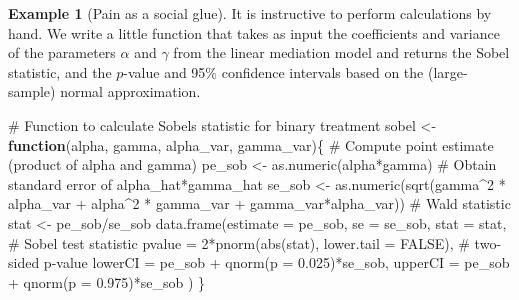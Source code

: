 \documentclass[
  11pt,
  letterpaper,
]{scrbook}
\newenvironment{Shaded}{\begin{snugshade}}{\end{snugshade}}
\newcommand{\AttributeTok}[1]{\textcolor[rgb]{0.40,0.45,0.13}{#1}}
\newcommand{\CommentTok}[1]{\textcolor[rgb]{0.37,0.37,0.37}{#1}}
\newcommand{\ConstantTok}[1]{\textcolor[rgb]{0.56,0.35,0.01}{#1}}
\newcommand{\ControlFlowTok}[1]{\textcolor[rgb]{0.00,0.23,0.31}{\textbf{#1}}}
\newcommand{\DecValTok}[1]{\textcolor[rgb]{0.68,0.00,0.00}{#1}}
\newcommand{\FloatTok}[1]{\textcolor[rgb]{0.68,0.00,0.00}{#1}}
\newcommand{\FunctionTok}[1]{\textcolor[rgb]{0.28,0.35,0.67}{#1}}
\newcommand{\NormalTok}[1]{\textcolor[rgb]{0.00,0.23,0.31}{#1}}
\newcommand{\OtherTok}[1]{\textcolor[rgb]{0.00,0.23,0.31}{#1}}
\newcommand{\SpecialCharTok}[1]{\textcolor[rgb]{0.37,0.37,0.37}{#1}}
\theoremstyle{definition}
\newtheorem{example}{Example}[chapter]
\theoremstyle{definition}
\theoremstyle{remark}
\begin{document}
\begin{example}[Pain as a social
glue]
It is instructive to perform calculations by hand. We write a little
function that takes as input the coefficients and variance of the
parameters \(\alpha\) and \(\gamma\) from the linear mediation model and
returns the Sobel statistic, and the \(p\)-value and 95\% confidence
intervals based on the (large-sample) normal approximation.

\begin{Shaded}
\begin{Highlighting}[]
\CommentTok{\# Function to calculate Sobel\textquotesingle{}s statistic for binary treatment}
\NormalTok{sobel }\OtherTok{\textless{}{-}} \ControlFlowTok{function}\NormalTok{(alpha, gamma, alpha\_var, gamma\_var)\{}
  \CommentTok{\# Compute point estimate (product of alpha and gamma)}
\NormalTok{  pe\_sob }\OtherTok{\textless{}{-}} \FunctionTok{as.numeric}\NormalTok{(alpha}\SpecialCharTok{*}\NormalTok{gamma)}
  \CommentTok{\# Obtain standard error of alpha\_hat*gamma\_hat}
\NormalTok{  se\_sob }\OtherTok{\textless{}{-}} \FunctionTok{as.numeric}\NormalTok{(}\FunctionTok{sqrt}\NormalTok{(gamma}\SpecialCharTok{\^{}}\DecValTok{2} \SpecialCharTok{*}\NormalTok{ alpha\_var }\SpecialCharTok{+}\NormalTok{ alpha}\SpecialCharTok{\^{}}\DecValTok{2} \SpecialCharTok{*}\NormalTok{ gamma\_var  }\SpecialCharTok{+}\NormalTok{ gamma\_var}\SpecialCharTok{*}\NormalTok{alpha\_var))}
  \CommentTok{\# Wald statistic}
\NormalTok{  stat }\OtherTok{\textless{}{-}}\NormalTok{ pe\_sob}\SpecialCharTok{/}\NormalTok{se\_sob}
  \FunctionTok{data.frame}\NormalTok{(}\AttributeTok{estimate =}\NormalTok{ pe\_sob,}
             \AttributeTok{se =}\NormalTok{ se\_sob,}
             \AttributeTok{stat =}\NormalTok{ stat, }\CommentTok{\# Sobel test statistic}
             \AttributeTok{pvalue =} \DecValTok{2}\SpecialCharTok{*}\FunctionTok{pnorm}\NormalTok{(}\FunctionTok{abs}\NormalTok{(stat), }\AttributeTok{lower.tail =} \ConstantTok{FALSE}\NormalTok{), }\CommentTok{\# two{-}sided p{-}value}
             \AttributeTok{lowerCI =}\NormalTok{ pe\_sob }\SpecialCharTok{+} \FunctionTok{qnorm}\NormalTok{(}\AttributeTok{p =} \FloatTok{0.025}\NormalTok{)}\SpecialCharTok{*}\NormalTok{se\_sob,}
             \AttributeTok{upperCI =}\NormalTok{ pe\_sob }\SpecialCharTok{+} \FunctionTok{qnorm}\NormalTok{(}\AttributeTok{p =} \FloatTok{0.975}\NormalTok{)}\SpecialCharTok{*}\NormalTok{se\_sob}
\NormalTok{  )}
\NormalTok{\}}


\end{Highlighting}
\end{Shaded}
\end{example}
\end{document}
